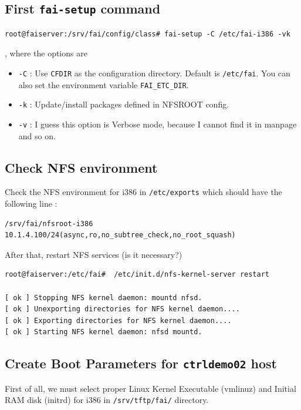 \documentclass[11pt
  , a4paper
  , article
  , oneside
]{memoir}
\begin{document}
\subsection{First \texttt{fai-setup} command}
\begin{lstlisting}
root@faiserver:/srv/fai/config/class# fai-setup -C /etc/fai-i386 -vk
\end{lstlisting}
, where the options are 
\begin{itemize}
\item \texttt{-C} : Use \texttt{CFDIR} as the configuration directory. Default is \texttt{/etc/fai}. You can also set the environment variable \texttt{FAI\_ETC\_DIR}.
\item \texttt{-k} : Update/install packages defined in NFSROOT config.
\item \texttt{-v} : I guess this option is Verbose mode, because I cannot find it in manpage and so on. 
\end{itemize}

\subsection{Check NFS environment}
Check the NFS environment for i386 in \texttt{/etc/exports} which should have the following line :
\begin{lstlisting}
/srv/fai/nfsroot-i386 10.1.4.100/24(async,ro,no_subtree_check,no_root_squash)
\end{lstlisting}

After that, restart NFS services (is it necessary?)

\begin{lstlisting}
root@faiserver:/etc/fai#  /etc/init.d/nfs-kernel-server restart

[ ok ] Stopping NFS kernel daemon: mountd nfsd.
[ ok ] Unexporting directories for NFS kernel daemon....
[ ok ] Exporting directories for NFS kernel daemon....
[ ok ] Starting NFS kernel daemon: nfsd mountd.
\end{lstlisting}

\subsection{Create Boot Parameters for \texttt{ctrldemo02} host}
First of all, we must select proper Linux Kernel Executable (vmlinuz) and Initial RAM disk (initrd) for i386 in \texttt{/srv/tftp/fai/} directory.
\end{document}
